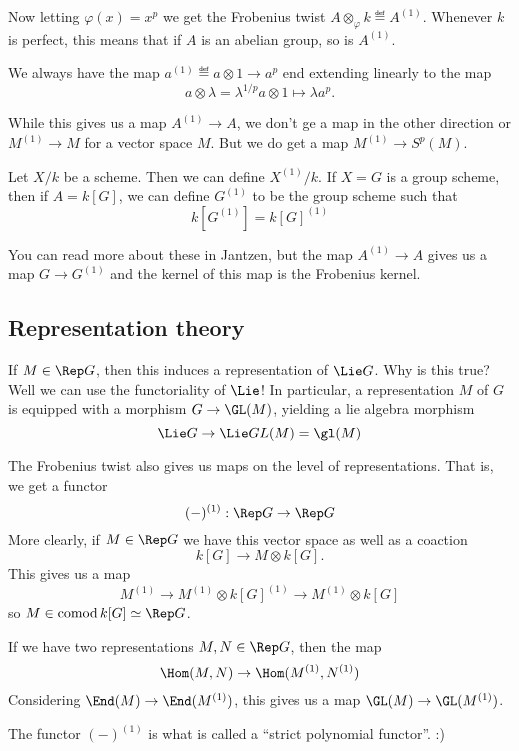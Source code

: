 \documentclass[12pt]{article}
\begin{document}
Now letting $\varphi(x)=x^p$ we get the Frobenius twist $A\otimes_\varphi k\eqdef A^{(1)}$. Whenever $k$ is perfect, this means that if $A$ is an 
abelian group, so is $A^{(1)}$.

We always have the map $a^{(1)}\eqdef a\otimes 1\to a^p$ end extending linearly to the map 
\[a\otimes\lambda=\lambda^{1/p}a\otimes 1\mapsto \lambda a^p.\]
\begin{rmk}
	While this gives us a map $A^{(1)}\to A$, we don't ge a map in the other direction or $M^{(1)}\to M$ for a vector space $M$.
	But we do get a map $M^{(1)}\to S^p(M)$.
\end{rmk}
\begin{rmk}
	Let $X/k$ be a scheme. Then we can define $X^{(1)}/k$. If $X=G$ is a group scheme, then if $A=k[G]$,
	we can define $G^{(1)}$ to be the group scheme such that 
	\[k[G^{(1)}]=k[G]^{(1)}\]
\end{rmk}

You can read more about these in Jantzen, but the map $A^{(1)}\to A$ gives us a map $G\to G^{(1)}$
and the kernel of this map is the Frobenius kernel.

\subsection{Representation theory}
\begin{rmk}
	If $M\in\Rep G$, then this induces a representation of $\Lie G$. Why is this true? Well we can use the functoriality 
	of $\Lie$! In particular, a representation $M$ of $G$ is equipped with a morphism $G\to \GL(M)$, yielding a lie algebra morphism 
	\[\Lie G\to \Lie GL(M)=\gl(M)\]
\end{rmk}

The Frobenius twist also gives us maps on the level of representations. That is, we get a functor 
\[(-)^{(1)}:\Rep G\to \Rep G\]
More clearly, if $M\in\Rep G$ we have this vector space as well as a coaction 
\[k[G]\to M\otimes k[G].\]
This gives us a map 
\[M^{(1)}\to M^{(1)}\otimes k[G]^{(1)}\to M^{(1)}\otimes k[G]\]
so $M\in \operatorname{comod}k[G]\simeq \Rep G$.

If we have two representations $M,N\in\Rep G$, then the map 
\[\Hom(M,N)\to \Hom(M^{(1)},N^{(1)})\]
Considering $\End(M)\to \End(M^{(1)})$, this gives us a map $\GL(M)\to\GL(M^{(1)})$.

\begin{rmk}
	The functor $(-)^{(1)}$ is what is called a ``strict polynomial functor''. :)
\end{rmk}
\end{document}
